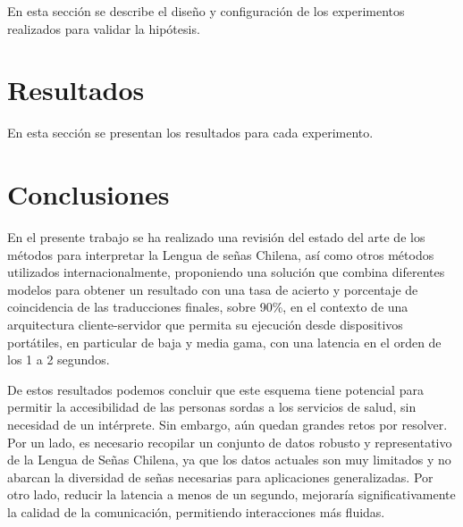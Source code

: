 \documentclass{article}
\begin{document}
En esta sección se describe el diseño y configuración de los experimentos realizados para validar la hipótesis.


\section{Resultados}

En esta sección se presentan los resultados para cada experimento.


\section{Conclusiones}

En el presente trabajo se ha realizado una revisión del estado del arte de los métodos para interpretar la Lengua de señas Chilena, así como otros métodos utilizados internacionalmente, proponiendo una solución que combina diferentes modelos para obtener un resultado con una tasa de acierto y porcentaje de coincidencia de las traducciones finales, sobre 90\%, en el contexto de una arquitectura cliente-servidor que permita su ejecución desde dispositivos portátiles, en particular de baja y media gama, con una latencia en el orden de los 1 a 2 segundos.


De estos resultados podemos concluir que este esquema tiene potencial para permitir la accesibilidad de las personas sordas a los servicios de salud, sin necesidad de un intérprete. Sin embargo, aún quedan grandes retos por resolver. Por un lado, es necesario recopilar un conjunto de datos robusto y representativo de la Lengua de Señas Chilena, ya que los datos actuales son muy limitados y no abarcan la diversidad de señas necesarias para aplicaciones generalizadas. Por otro lado, reducir la latencia a menos de un segundo, mejoraría significativamente la calidad de la comunicación, permitiendo interacciones más fluidas.
\end{document}
